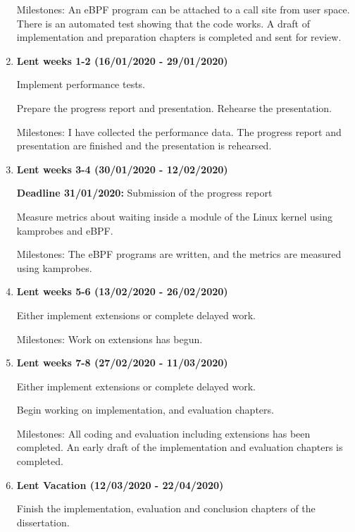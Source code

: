 \begin{enumerate}
            Milestones: An eBPF program can be attached to a call site from user space.
            There is an automated test showing that the code works.
            A draft of implementation and preparation chapters is completed and sent for review.

        \item {\bf Lent weeks 1-2 (16/01/2020 - 29/01/2020)} 

            Implement performance tests.

            Prepare the progress report and presentation. Rehearse the presentation.

            Milestones: I have collected the performance data.
            The progress report and presentation are finished and the presentation is rehearsed.

        \item {\bf Lent weeks 3-4 (30/01/2020 - 12/02/2020)} 

            {\bf Deadline 31/01/2020:} Submission of the progress report 
            
            Measure metrics about waiting inside a module of the Linux kernel using kamprobes and eBPF.

            Milestones: The eBPF programs are written, and the metrics are measured using kamprobes.

        \item {\bf Lent weeks 5-6 (13/02/2020 - 26/02/2020)} 

            Either implement extensions or complete delayed work.

            Milestones: Work on extensions has begun.

        \item {\bf Lent weeks 7-8 (27/02/2020 - 11/03/2020)}

            Either implement extensions or complete delayed work.
            
            Begin working on implementation, and evaluation chapters.

            Milestones: All coding and evaluation including extensions has been completed. An early draft
            of the implementation and evaluation chapters is completed.

        \item {\bf Lent Vacation (12/03/2020 - 22/04/2020)}

            Finish the implementation, evaluation and conclusion chapters of the dissertation.


\end{enumerate}
